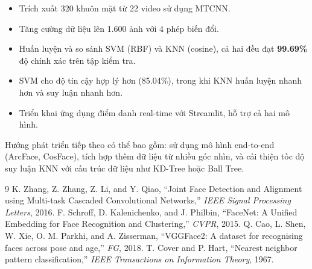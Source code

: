\documentclass[12pt,a4paper]{article}
\begin{document}
\begin{itemize}
    \item Trích xuất 320 khuôn mặt từ 22 video sử dụng MTCNN.
    \item Tăng cường dữ liệu lên 1.600 ảnh với 4 phép biến đổi.
    \item Huấn luyện và so sánh SVM (RBF) và KNN (cosine), cả hai đều đạt \textbf{99.69\%} độ chính xác trên tập kiểm tra.
    \item SVM cho độ tin cậy hợp lý hơn (85.04\%), trong khi KNN huấn luyện nhanh hơn và suy luận nhanh hơn.
    \item Triển khai ứng dụng điểm danh real-time với Streamlit, hỗ trợ cả hai mô hình.
\end{itemize}

Hướng phát triển tiếp theo có thể bao gồm: sử dụng mô hình end-to-end (ArcFace, CosFace), tích hợp thêm dữ liệu từ nhiều góc nhìn, và cải thiện tốc độ suy luận KNN với cấu trúc dữ liệu như KD-Tree hoặc Ball Tree.

\newpage

\begin{thebibliography}{9}
 K. Zhang, Z. Zhang, Z. Li, and Y. Qiao, ``Joint Face Detection and Alignment using Multi-task Cascaded Convolutional Networks,'' \textit{IEEE Signal Processing Letters}, 2016.
 F. Schroff, D. Kalenichenko, and J. Philbin, ``FaceNet: A Unified Embedding for Face Recognition and Clustering,'' \textit{CVPR}, 2015.
 Q. Cao, L. Shen, W. Xie, O. M. Parkhi, and A. Zisserman, ``VGGFace2: A dataset for recognising faces across pose and age,'' \textit{FG}, 2018.
 T. Cover and P. Hart, ``Nearest neighbor pattern classification,'' \textit{IEEE Transactions on Information Theory}, 1967.
\end{thebibliography}
\end{document}
